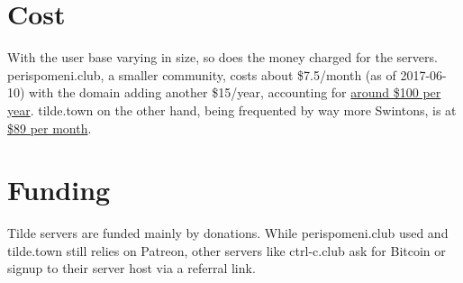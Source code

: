 \section{Cost}

With the user base varying in size, so does the money charged for the servers. perispomeni.club, a smaller community, costs about \$7.5/month (as of 2017-06-10) with the domain adding another \$15/year, accounting for \href{http://perispomeni.club/invoices/}{around \$100 per year}. tilde.town on the other hand, being frequented by way more Swintons, is at \href{https://www.patreon.com/nathanielksmith}{\$89 per month}.

\section{Funding}

Tilde servers are funded mainly by donations. While perispomeni.club used and tilde.town still relies on Patreon, other servers like ctrl-c.club ask for Bitcoin or signup to their server host via a referral link.
